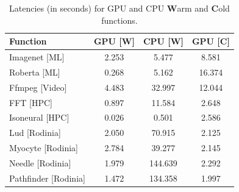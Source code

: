 \begin{table}
  \caption{Latencies (in seconds) for GPU and CPU \textbf{W}arm and \textbf{C}old functions.}
  \label{tab:gpu-cpu}
  \vspace{\captionspace}
  \begin{tabular}{lccc}
    \hline
    Function & GPU [\textbf{W}] & CPU [\textbf{W}] & GPU [\textbf{C}] \\
    \hline
  Imagenet [ML] & 2.253 & 5.477 &     8.581 \\
  Roberta [ML] & 0.268 & 5.162 &     16.374 \\
  Ffmpeg [Video] & 4.483 & 32.997 &     12.044 \\
  FFT [HPC] & 0.897 & 11.584 &     2.648 \\
  Isoneural [HPC] & 0.026 & 0.501 &     2.586 \\
  Lud [Rodinia] & 2.050 & 70.915 &     2.125 \\
    Myocyte [Rodinia] & 2.784 & 39.277 &      2.145 \\
  Needle [Rodinia] & 1.979 & 144.639 &     2.292 \\
  Pathfinder [Rodinia] & 1.472 & 134.358 &     1.997 \\
  \end{tabular}
  \vspace{-0.4cm}
\end{table}



